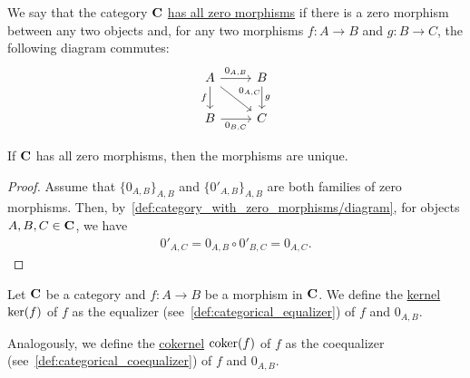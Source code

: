 \begin{definition}\label{def:category_with_zero_morphisms}
  We say that the category $\operatorname{\mathbf{C}}$ \uline{has all zero morphisms} if there is a zero morphism between any two objects and, for any two morphisms \mbox{$f: A \to B$} and \mbox{$g: B \to C$}, the following diagram commutes:
  \begin{equation}\label{def:category_with_zero_morphisms/diagram}
    \begin{tikzcd}[baseline=(current bounding box.center)]
      A \arrow[d, "f"'] \arrow[r, "0_{A,B}"] \arrow[rd, "0_{A,C}"] & B \arrow[d, "g"] \\
      B \arrow[r, "0_{B,C}"']                                      & C
    \end{tikzcd}
  \end{equation}
\end{definition}

\begin{proposition}\label{thm:zero_morphisms_are_unique}
  If $\operatorname{\mathbf{C}}$ has all zero morphisms, then the morphisms are unique.
\end{proposition}
\begin{proof}
  Assume that $\{ 0_{A,B} \}_{A,B}$ and $\{ 0'_{A,B} \}_{A,B}$ are both families of zero morphisms. Then, by~\cref{def:category_with_zero_morphisms/diagram}, for objects $A, B, C \in \operatorname{\mathbf{C}}$, we have
  \begin{align*}
    0'_{A,C} = 0_{A,B} \circ 0'_{B,C} = 0_{A,C}.
  \end{align*}
\end{proof}

\begin{definition}\label{def:categorical_kernel}
  Let $\operatorname{\mathbf{C}}$ be a category and $f: A \to B$ be a morphism in $\operatorname{\mathbf{C}}$. We define the \uline{kernel} $\operatorname{ker}(f)$ of $f$ as the equalizer (see~\cref{def:categorical_equalizer}) of $f$ and $0_{A,B}$.

  Analogously, we define the \uline{cokernel} $\operatorname{coker}(f)$ of $f$ as the coequalizer (see~\cref{def:categorical_coequalizer}) of $f$ and $0_{A,B}$.
\end{definition}
